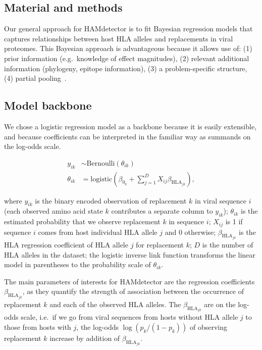 \documentclass{bioinfo}
\begin{document}
\begin{methods}
  \section{Material and methods}

  Our general approach for HAMdetector is to fit Bayesian regression models that captures relationships between host HLA alleles and replacements in viral proteomes. This Bayesian approach is advantageous because it allows use of: (1) prior information (e.g.\ knowledge of effect magnitudes), (2) relevant additional information (phylogeny, epitope information), (3) a problem-specific structure, (4) partial pooling~\citep{Gelman2010}.
  
\subsection{Model backbone}

We chose a logistic regression model as a backbone because it is easily extensible, and because coefficients can be interpreted in the familiar way as summands on the log-odds scale.

\begin{align}
\label{eq:backbone}
  y_{ik} & \sim \text{Bernoulli}(\theta_{ik}) \\
  \theta_{ik} & = \text{logistic}\left(\beta_{0_{k}} + \sum_{j=1}^{D} X_{ij}\beta_{\text{HLA}_{jk}}\right),
\end{align}

where \(y_{ik}\) is the binary encoded observation of replacement $k$ in viral sequence $i$ (each observed amino acid state $k$ contributes a separate column to $y_{ik}$); \(\theta_{ik}\) is the estimated probability that we observe replacement \(k\) in sequence \(i\); \(X_{ij}\) is 1 if sequence \(i\) comes from host individual HLA allele \(j\) and 0 otherwise; $\beta_{\text{HLA}_{jk}}$ is the HLA regression coefficient of HLA allele \(j\) for replacement \(k\); \(D\) is the number of HLA alleles in the dataset; the logistic inverse link function transforms the linear model in parentheses to the probability scale of $\theta_{ik}$.

The main parameters of interests for HAMdetector are the regression coefficients $\beta_{\text{HLA}_{jk}}$, as they quantify the strength of association between the occurrence of replacement \(k\) and each of the observed HLA alleles. The $\beta_{\text{HLA}_{jk}}$ are on the log-odds scale, i.e.\ if we go from viral sequences from hosts without HLA allele $j$ to those from hosts with $j$, the log-odds $\log (p_k/(1-p_k))$ of observing replacement \(k\) increase by addition of $\beta_{\text{HLA}_{jk}}$.


\end{methods}
\end{document}
